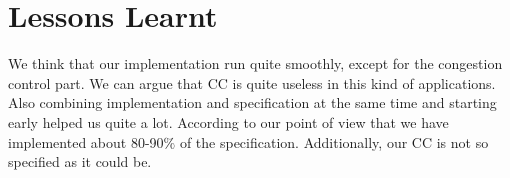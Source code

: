 \chapter{Lessons Learnt}


We think that our implementation run quite smoothly, except for the congestion
control part. We can argue that CC is quite useless in this kind of
applications. Also combining implementation and specification at the same time
and starting early helped us quite a lot. According to our point of view that we
have implemented about 80-90$\%$ of the specification. Additionally, our CC is
not so specified as it could be.


